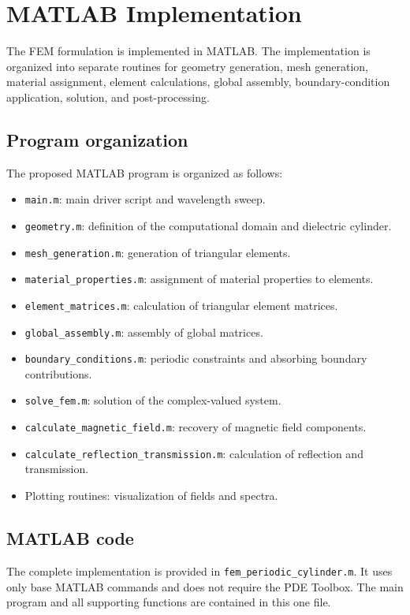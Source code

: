 \documentclass{article}
\begin{document}
\chapter{MATLAB Implementation}

The FEM formulation is implemented in MATLAB. The implementation is
organized into separate routines for geometry generation, mesh
generation, material assignment, element calculations, global
assembly, boundary-condition application, solution, and
post-processing.

\section{Program organization}

The proposed MATLAB program is organized as follows:
\begin{itemize}
    \item \texttt{main.m}: main driver script and wavelength sweep.
    \item \texttt{geometry.m}: definition of the computational domain
    and dielectric cylinder.
    \item \texttt{mesh\_generation.m}: generation of triangular elements.
    \item \texttt{material\_properties.m}: assignment of material
    properties to elements.
    \item \texttt{element\_matrices.m}: calculation of triangular
    element matrices.
    \item \texttt{global\_assembly.m}: assembly of global matrices.
    \item \texttt{boundary\_conditions.m}: periodic constraints and
    absorbing boundary contributions.
    \item \texttt{solve\_fem.m}: solution of the complex-valued system.
    \item \texttt{calculate\_magnetic\_field.m}: recovery of magnetic
    field components.
    \item \texttt{calculate\_reflection\_transmission.m}: calculation
    of reflection and transmission.
    \item Plotting routines: visualization of fields and spectra.
\end{itemize}

\section{MATLAB code}
The complete implementation is provided in \texttt{fem\_periodic\_cylinder.m}.
It uses only base MATLAB commands and does not require the PDE Toolbox.
The main program and all supporting functions are contained in this one file.
\end{document}
